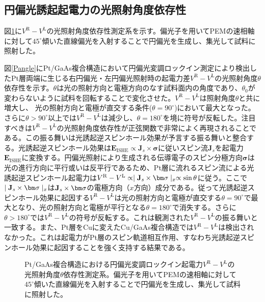 \subsection{円偏光誘起起電力の光照射角度依存性}
図\ref{anglesetup}に$V^\text{R}-V^\text{L}$の光照射角度依存性測定系を示す。偏光子を用いてPEMの速相軸に対して$45^\circ$傾いた直線偏光を入射することで円偏光を生成し、集光して試料に照射した。

図\ref{Pangle}にPt/GaAs複合構造において円偏光変調ロックイン測定により検出したPt層両端に生じる右円偏光・左円偏光照射時の起電力差$V^\text{R}-V^\text{L}$の光照射角度$\theta$依存性を示す。$\theta$は光の照射方向と電極方向のなす試料面内の角度であり、$\theta_0$が変わらないように試料を回転することで変化させた。$V^\text{R}-V^\text{L}$は照射角度$\theta$と共に増大し、
光の照射方向と電極が直交する条件($\theta=90^\circ$)において最大となった。さらに$\theta>90^\circ$以上では$V^\text{R}-V^\text{L}$は減少し、$\theta=180^\circ$を境に符号が反転した。注目すべきは$V^\text{R}-V^\text{L}$の光照射角度依存性が正弦関数で非常によく再現されることである。この振る舞いは光誘起逆スピンホール効果が予言する振る舞いと整合する。光誘起逆スピンホール効果は$\bm{E}_\text{ISHE} \propto \bm{J}_s\times \bm{\sigma}$に従いスピン流$\bm{J}_s$を起電力$\bm{E}_\text{ISHE}$に変換する。円偏光照射により生成される伝導電子のスピン分極方向$\bm{\sigma}$は光の進行方向に平行或いは反平行であるため\cite{Meier}、Pt層に流れるスピン流による光誘起逆スピンホール起電力は$V^\text{R}-V^\text{L}\propto \mid   {\bf J}_{\it s}\times {\bm \sigma}\mid _{x }\propto \sin\theta$に従う。ここで$\mid   {\bf J}_{\it s}\times {\bm \sigma}\mid _{x }$は$ {\bf J}_{\it s}\times {\bm \sigma}$の電極方向（$x$方向）成分である。従って光誘起逆スピンホール効果に起因する$V^\text{R}-V^\text{L}$は光の照射方向と電極が直交する$\theta=90^\circ$で最大となり、光の照射方向と電極が平行となる$\theta=180^\circ$で消失する。さらに$\theta>180^\circ$では$V^\text{R}-V^\text{L}$の符号が反転する。これは観測された$V^\text{R}-V^\text{L}$の振る舞いと一致する。また、Pt層をCuに変えたCu/GaAs複合構造では$V^\text{R}-V^\text{L}$は検出されなかった。これは起電力がPt層のスピン軌道相互作用、すなわち光誘起逆スピンホール効果に起因することを強く支持する結果である。





\begin{figure}[tbp]
\begin{center}
\caption{Pt/GaAs複合構造における円偏光変調ロックイン起電力$V^\text{R}-V^\text{L}$の光照射角度$\theta$依存性測定系。偏光子を用いてPEMの速相軸に対して$45^\circ$傾いた直線偏光を入射することで円偏光を生成し、集光して試料に照射した。}
\label{anglesetup} 
\end{center}
\end{figure}





